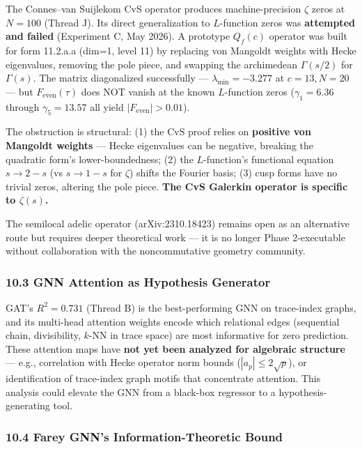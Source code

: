 \documentclass[
]{article}
\begin{document}
The Connes--van Suijlekom CvS operator produces machine-precision
\(\zeta\) zeros at \(N=100\) (Thread J). Its direct generalization to
\(L\)-function zeros was \textbf{attempted and failed} (Experiment C,
May 2026). A prototype \(Q_f(c)\) operator was built for form 11.2.a.a
(dim=1, level 11) by replacing von Mangoldt weights with Hecke
eigenvalues, removing the pole piece, and swapping the archimedean
\(\Gamma(s/2)\) for \(\Gamma(s)\). The matrix diagonalized successfully
--- \(\lambda_{\min} = -3.277\) at \(c=13,N=20\) --- but
\(F_{\text{even}}(\tau)\) does NOT vanish at the known \(L\)-function
zeros (\(\gamma_1 = 6.36\) through \(\gamma_5 = 13.57\) all yield
\(|F_{\text{even}}| > 0.01\)).

The obstruction is structural: (1) the CvS proof relies on
\textbf{positive von Mangoldt weights} --- Hecke eigenvalues can be
negative, breaking the quadratic form's lower-boundedness; (2) the
\(L\)-function's functional equation \(s \to 2-s\) (vs \(s \to 1-s\) for
\(\zeta\)) shifts the Fourier basis; (3) cusp forms have no trivial
zeros, altering the pole piece. \textbf{The CvS Galerkin operator is
specific to \(\zeta(s)\).}

The semilocal adelic operator (arXiv:2310.18423) remains open as an
alternative route but requires deeper theoretical work --- it is no
longer Phase 2-executable without collaboration with the noncommutative
geometry community.

\hypertarget{gnn-attention-as-hypothesis-generator}{%
\subsubsection{10.3 GNN Attention as Hypothesis
Generator}\label{gnn-attention-as-hypothesis-generator}}

GAT's \(R^2 = 0.731\) (Thread B) is the best-performing GNN on
trace-index graphs, and its multi-head attention weights encode which
relational edges (sequential chain, divisibility, \(k\)-NN in trace
space) are most informative for zero prediction. These attention maps
have \textbf{not yet been analyzed for algebraic structure} --- e.g.,
correlation with Hecke operator norm bounds (\(|a_p| \le 2\sqrt{p}\)),
or identification of trace-index graph motifs that concentrate
attention. This analysis could elevate the GNN from a black-box
regressor to a hypothesis-generating tool.

\hypertarget{farey-gnns-information-theoretic-bound}{%
\subsubsection{10.4 Farey GNN's Information-Theoretic
Bound}\label{farey-gnns-information-theoretic-bound}}
\end{document}
